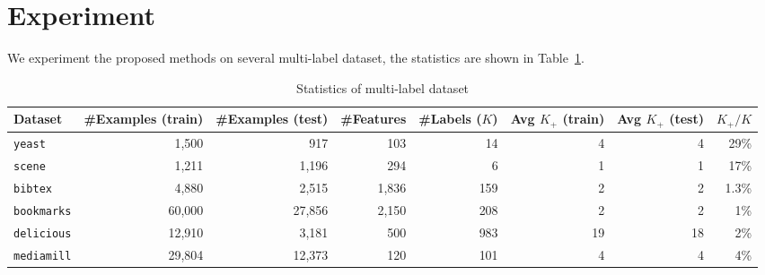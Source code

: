 \section{Experiment}
\label{sec:experiment}

We experiment the proposed methods on several multi-label dataset, the statistics are shown in Table~\ref{tab:dataset}.

\begin{table}[!h]
\centering
\caption{Statistics of multi-label dataset}
\label{tab:dataset}
\begin{tabular}{l*{7}{r}} \hline \hline
Dataset & \#Examples (train) & \#Examples (test) & \#Features & \#Labels ($K$) & Avg $K_+$ (train) & Avg $K_+$ (test) & $K_+ / K$ \\ \hline
\texttt{yeast}     & 1,500  & 917    & 103  & 14  & 4  & 4  & 29\%  \\
\texttt{scene}     & 1,211  & 1,196  & 294  & 6   & 1  & 1  & 17\%  \\ 
\texttt{bibtex}    & 4,880  & 2,515  & 1,836 & 159 & 2  & 2  & 1.3\% \\
\texttt{bookmarks} & 60,000 & 27,856 & 2,150 & 208 & 2  & 2  & 1\%   \\
\texttt{delicious} & 12,910 & 3,181  & 500  & 983 & 19 & 18 & 2\%   \\
\texttt{mediamill} & 29,804 & 12,373 & 120  & 101 & 4  & 4  & 4\%   \\
\hline
\end{tabular}
\end{table}

